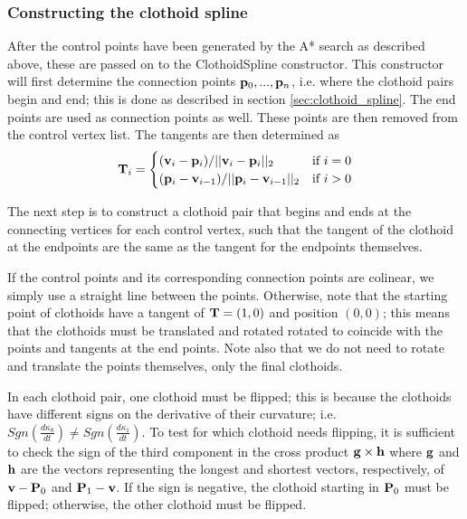\subsubsection{Constructing the clothoid spline}
After the control points have been generated by the A* search as described above, these are passed on to the ClothoidSpline constructor. This constructor will first determine the connection points ${\mathbf p}_0, ..., {\mathbf p}_n$, i.e. where the clothoid pairs begin and end; this is done as described in section \ref{sec:clothoid_spline}. The end points are used as connection points as well. These points are then removed from the control vertex list. The tangents are then determined as 
\begin{equation}
{\mathbf T}_i = 
\begin{cases}
({\mathbf v}_i - {\mathbf p}_i)/||{\mathbf v}_i - {\mathbf p}_i||_2 & \mbox{if $i = 0$}\\
({\mathbf p}_i - {\mathbf v}_{i-1})/||{\mathbf p}_i - {\mathbf v}_{i-1}||_2 & \mbox{if $i > 0$}
\end{cases}
\label{eq:connector_tangents}
\end{equation}

The next step is to  construct a clothoid pair that begins and ends at the connecting vertices for each control vertex, such that the tangent of the clothoid at the endpoints are the same as the tangent for the endpoints themselves. 

If the control points and its corresponding connection points are colinear, we simply use a straight line between the points. Otherwise, note that the starting point of clothoids have a tangent of ${\mathbf T} = (1,0)$ and position $(0,0)$; this means that the clothoids must be translated and rotated rotated  to coincide with the points and tangents at the end points. Note also that we do not need to rotate and translate the points themselves, only the final clothoids. 

In each clothoid pair, one clothoid must be flipped; this is because the clothoids have different signs on the derivative of their curvature; i.e. $Sgn(\frac{d\kappa_{0}}{dt})\neq Sgn(\frac{d\kappa_{1}}{dt})$.  To test for which clothoid needs flipping, it is sufficient to check the sign of the third component in the cross product ${\mathbf g}\times {\mathbf h}$ where ${\mathbf g}$ and ${\mathbf h}$ are the vectors representing the longest and shortest vectors, respectively, of ${\mathbf v}-{\mathbf P}_0$ and ${\mathbf P}_1 - {\mathbf v}$. If the sign is negative, the clothoid starting in ${\mathbf P}_0$ must be flipped; otherwise, the other clothoid must be flipped.

